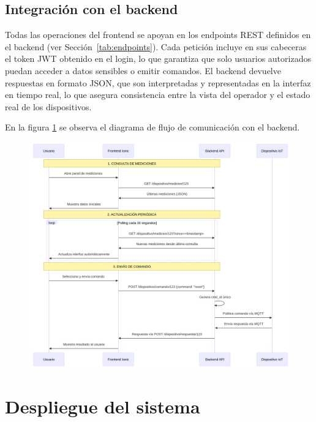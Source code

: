 \subsection{Integración con el backend}

Todas las operaciones del frontend se apoyan en los endpoints REST definidos en el backend (ver Sección~\ref{tab:endpoints}).  
Cada petición incluye en sus cabeceras el token JWT obtenido en el login, lo que garantiza que solo usuarios autorizados puedan acceder a datos sensibles o emitir comandos.  
El backend devuelve respuestas en formato JSON, que son interpretadas y representadas en la interfaz en tiempo real, lo que asegura consistencia entre la vista del operador y el estado real de los dispositivos.

\pagebreak
En la figura \ref{fig:diagramaflujorestapi} se observa el diagrama de flujo de comunicación con el backend.

\begin{figure}[H]
 
  \centering
  \includegraphics[width=1.1\linewidth]{./Figures/diagFlujoRestApi.png}
  \label{fig:diagramaflujorestapi}
\end{figure}


\clearpage

\section{Despliegue del sistema}

